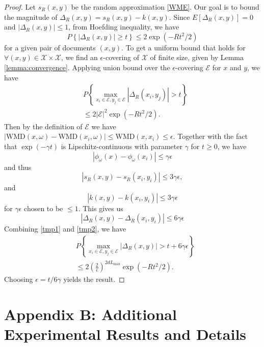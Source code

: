 \documentclass[11pt,a4paper]{article}
\newcommand{\X}{\mathcal{X}}
\newcommand{\1}{\boldsymbol{1}}
\newcommand{\WMD}{\text{WMD}}
\newcommand{\E}{\mathcal{E}}
\begin{document}
\begin{proof}
Let $s_R(x,y)$ be the random approximation \eqref{WME}. Our goal is to bound the magnitude of $\Delta_R(x,y)=s_R(x,y)-k(x,y)$. Since $E[\Delta_R(x,y)]=0$ and $|\Delta_R(x,y)|\leq 1$, from Hoefding inequality, we have
$$
P\left\{ |\Delta_R(x,y)|\geq t \right\} \leq 2 \exp(-Rt^2/2)
$$
for a given pair of documents $(x,y)$. To get a uniform bound that holds for $\forall (x,y)\in\X\times\X$, we find an $\epsilon$-covering of $\X$ of finite size, given by Lemma \ref{lemma:convergence}. Applying union bound over the $\epsilon$-covering $\E$ for $x$ and $y$, we have
\begin{equation}\label{tmp1}
\begin{aligned}
&P\left\{ \max_{x_i\in\E,y_j\in\E} |\Delta_R(x_i,y_j)| > t \right\} \\
&\leq 2|\E|^2\exp(-Rt^2/2).
\end{aligned}
\end{equation}
Then by the definition of $\E$ we have $|\WMD(x,\omega)-\WMD(x_i,\omega)|\leq \WMD(x,x_i)\leq \epsilon$. Together with the fact that $\exp(-\gamma t)$ is Lipschitz-continuous with parameter $\gamma$ for $t\geq0$, we have 
$$
|\phi_{\omega}(x)-\phi_{\omega}(x_i)|\leq \gamma\epsilon
$$
and thus
$$
|s_R(x,y)-s_R(x_i,y_i)|\leq 3\gamma\epsilon, 
$$
and
$$
|k(x,y)-k(x_i,y_i)|\leq 3\gamma\epsilon
$$
for $\gamma\epsilon$ chosen to be $\leq 1$. This gives us 
\begin{equation}\label{tmp2}
|\Delta_R(x,y)-\Delta_R(x_i,y_i)|\leq 6\gamma\epsilon
\end{equation}
Combining \eqref{tmp1} and \eqref{tmp2}, we have
\begin{equation}\label{tmp3}
\begin{aligned}
& P\left\{ \max_{x_i\in\E,y_j\in\E} |\Delta_R(x,y)| > t + 6\gamma \epsilon\right\} \\ 
& \leq 2\left(\frac{2}{\epsilon}\right)^{2dL_{\max}}\exp(-Rt^2/2).
\end{aligned}
\end{equation}
Choosing $\epsilon=t/6\gamma$ yields the result.
\end{proof}


\section{Appendix B: Additional Experimental Results and Details}
\label{App:Appendix B: Additional Experimental Results and Details}
\end{document}
